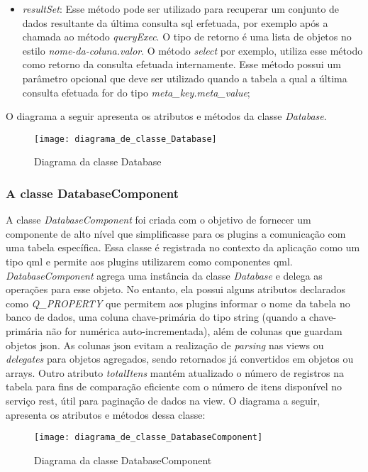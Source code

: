 \begin{itemize}
	\item \textit{resultSet}: Esse método pode ser utilizado para recuperar um conjunto de dados resultante da última consulta sql erfetuada, por exemplo após a chamada ao método \textit{queryExec}. O tipo de retorno é uma lista de objetos no estilo \textit{nome-da-coluna.valor}. O método \textit{select} por exemplo, utiliza esse método como retorno da consulta efetuada internamente. Esse método possui um parâmetro opcional que deve ser utilizado quando a tabela a qual a última consulta efetuada for do tipo \textit{meta\_key.meta\_value};
\end{itemize}

O diagrama a seguir apresenta os atributos e métodos da classe \textit{Database}.

\begin{figure}[h]
	\texttt{[image: diagrama\_de\_classe\_Database]}
	\centering
	\caption{Diagrama da classe Database}
\end{figure}

\subsubsection{A classe DatabaseComponent}\label{sec:solucao-desenvolvida}
A classe \textit{DatabaseComponent} foi criada com o objetivo de fornecer um componente de alto nível que simplificasse para os plugins a comunicação com uma tabela específica. Essa classe é registrada no contexto da aplicação como um tipo qml e permite aos plugins utilizarem como componentes qml. \textit{DatabaseComponent} agrega uma instância da classe \textit{Database} e delega as operações para esse objeto. No entanto, ela possui alguns atributos declarados como \textit{Q\_PROPERTY} que permitem aos plugins informar o nome da tabela no banco de dados, uma coluna chave-primária do tipo string (quando a chave-primária não for numérica auto-incrementada), além de colunas que guardam objetos json. As colunas json evitam a realização de \textit{parsing} nas views ou \textit{delegates} para objetos agregados, sendo retornados já convertidos em objetos ou arrays. Outro atributo \textit{totalItens} mantém atualizado o número de registros na tabela para fins de comparação eficiente com o número de itens disponível no serviço rest, útil para paginação de dados na view. O diagrama a seguir, apresenta os atributos e métodos dessa classe:

\begin{figure}[H]
	\texttt{[image: diagrama\_de\_classe\_DatabaseComponent]}
	\centering
	\caption{Diagrama da classe DatabaseComponent}
\end{figure}

